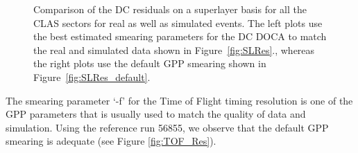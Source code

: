 \begin{figure}[htpb]\begin{center}
\caption[DC superlayers Resolution Matching]{\label{fig:DC_SL_Match}Comparison of the DC residuals on a superlayer basis for all the CLAS sectors for real as well as simulated events. The left plots use the best estimated smearing parameters for the DC DOCA to match the real and simulated data shown in Figure~\ref{fig:SLRes}., whereas the right plots use the default GPP smearing shown in Figure~\ref{fig:SLRes_default}.}
\end{center}\end{figure}

The smearing parameter `-f' for the Time of Flight timing resolution is one of the GPP parameters that is usually used to match the quality of data and simulation. Using the reference run 56855, we observe that the default GPP smearing is adequate (see Figure \ref{fig:TOF_Res}).

